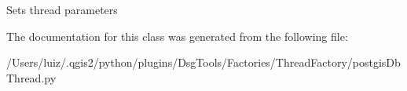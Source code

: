 \begin{DoxyVerb}Sets thread parameters
\end{DoxyVerb}
 

The documentation for this class was generated from the following file\+:\begin{DoxyCompactItemize}
\item 
/\+Users/luiz/.\+qgis2/python/plugins/\+Dsg\+Tools/\+Factories/\+Thread\+Factory/postgis\+Db\+Thread.\+py\end{DoxyCompactItemize}
